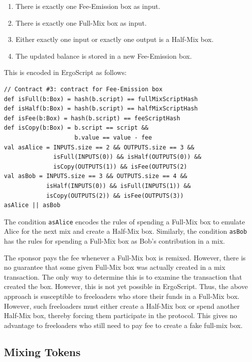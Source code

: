 \documentclass[runningheads]{llncs}
\newcommand{\langname}{ErgoScript\xspace}
\begin{document}
\begin{enumerate}
    \item There is exactly one Fee-Emission box as input.
    \item There is exactly one Full-Mix box as input.
    \item Either exactly one input or exactly one output is a Half-Mix box.
    \item The updated balance is stored in a new Fee-Emission box.
\end{enumerate}

This is encoded in \langname as follows:

{\small
\begin{Verbatim}[frame=single]
// Contract #3: contract for Fee-Emission box
def isFull(b:Box) = hash(b.script) == fullMixScriptHash 
def isHalf(b:Box) = hash(b.script) == halfMixScriptHash
def isFee(b:Box) = hash(b.script) == feeScriptHash
def isCopy(b:Box) = b.script == script && 
                    b.value == value - fee
val asAlice = INPUTS.size == 2 && OUTPUTS.size == 3 &&
              isFull(INPUTS(0)) && isHalf(OUTPUTS(0)) &&
              isCopy(OUTPUTS(1)) && isFee(OUTPUTS(2)
val asBob = INPUTS.size == 3 && OUTPUTS.size == 4 &&
            isHalf(INPUTS(0)) && isFull(INPUTS(1)) &&
            isCopy(OUTPUTS(2)) && isFee(OUTPUTS(3))
asAlice || asBob 
\end{Verbatim}
}

The condition \texttt{asAlice} encodes the rules of spending a Full-Mix box to emulate Alice for the next mix and create a Half-Mix box. Similarly, the condition \texttt{asBob} has the rules for spending a Full-Mix box as Bob's contribution in a mix. 

The sponsor pays the fee whenever a Full-Mix box is remixed. However, there is no guarantee that some given Full-Mix box was actually created in a mix transaction. The only way to determine this is to examine the transaction that created the box. However, this is not yet possible in \langname. Thus, the above approach is susceptible to freeloaders who store their funds in a Full-Mix box. However, such freeloaders must either create a Half-Mix box or spend another Half-Mix box, thereby forcing them participate in the protocol. This gives no advantage to freeloaders who still need to pay fee to create a fake full-mix box. 

\subsection{Mixing Tokens}
\end{document}
